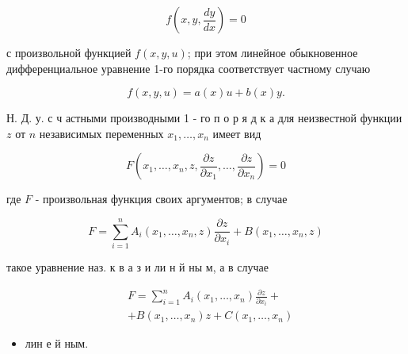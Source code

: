 \documentclass[10pt]{article}
\begin{document}
\[

f\left(x, y, \frac{d y}{d x}\right)=0

\]



с произвольной функцией $f(x, y, u)$; при этом линейное обыкновенное дифференциальное уравнение 1-го порядка соответствует частному случаю



\[

f(x, y, u)=a(x) u+b(x) y .

\]



Н. Д. у. с ч астными производными 1 - го п о р я д к а для неизвестной функции $z$ от $n$ независимых переменных $x_{1}, \ldots, x_{n}$ имеет вид



\[

F\left(x_{1}, \ldots, x_{n}, z, \frac{\partial z}{\partial x_{1}}, \ldots, \frac{\partial z}{\partial x_{n}}\right)=0

\]



где $F$ - произвольная функция своих аргументов; в случае



\[

F=\sum_{i=1}^{n} A_{i}\left(x_{1}, \ldots, x_{n}, z\right) \frac{\partial z}{\partial x_{i}}+B\left(x_{1}, \ldots, x_{n}, z\right)

\]



такое уравнение наз. к в а з и ли н й ны м, а в случае



\[

\begin{aligned}

& F=\sum_{i=1}^{n} A_{i}\left(x_{1}, \ldots, x_{n}\right) \frac{\partial z}{\partial x_{i}}+ \\

& +B\left(x_{1}, \ldots, x_{n}\right) z+C\left(x_{1}, \ldots, x_{n}\right)

\end{aligned}

\]



\begin{itemize}

  \item лин е й ным.

\end{itemize}
\end{document}
